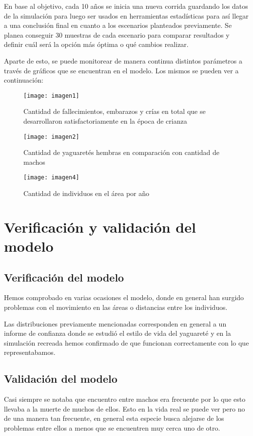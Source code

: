     En base al objetivo, cada 10 años se inicia una nueva corrida guardando los datos de la simulación para luego ser usados en herramientas estadísticas para así llegar a una conclusión final en cuanto a los escenarios planteados previamente. Se planea conseguir 30 muestras de cada escenario para comparar resultados y definir cuál será la opción más óptima o qué cambios realizar.

    Aparte de esto, se puede monitorear de manera continua distintos parámetros a través de gráficos que se encuentran en el modelo.
    Los mismos se pueden ver a continuación:

    \begin{figure}[H]
        \centering
        \texttt{[image: imagen1]}
        \caption{Cantidad de fallecimientos, embarazos y crías en total que se desarrollaron satisfactoriamente en la época de crianza}
        \label{fig:fig1}
    \end{figure}
    \begin{figure}[H]
        \centering
        \texttt{[image: imagen2]}
        \caption{Cantidad de yaguaretés hembras en comparación con cantidad de machos}
        \label{fig:fig2}
        \centering
        \texttt{[image: imagen4]}
        \caption{Cantidad de individuos en el área por año}
        \label{fig:fig4}
    \end{figure}

\section{Verificación y validación del modelo}
    \subsection{Verificación del modelo}
    Hemos comprobado en varias ocasiones el modelo, donde en general han surgido problemas con el movimiento en las
    áreas o distancias entre los individuos.

    Las distribuciones previamente mencionadas corresponden en general a un informe de confianza donde se estudió el
    estilo de vida del yaguareté y en la simulación recreada hemos confirmado de que funcionan correctamente con lo que
    representabamos.

    \subsection{Validación del modelo}
    Casi siempre se notaba que encuentro entre machos era frecuente por lo que esto llevaba a la muerte de muchos de
ellos. Esto en la vida real se puede ver pero no de una manera tan frecuente, en general esta especie busca alejarse de
los problemas entre ellos a menos que se encuentren muy cerca uno de otro.

